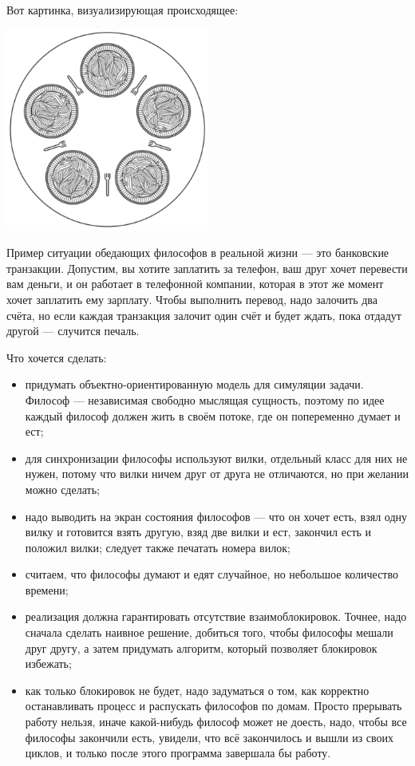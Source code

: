 \documentclass{../../text-style}
\begin{document}
Вот картинка, визуализирующая происходящее:

\begin{center}
    \includegraphics[width=0.5\textwidth]{diningPhilosophers.png}
\end{center}

Пример ситуации обедающих философов в реальной жизни --- это банковские транзакции. Допустим, вы хотите заплатить за телефон, ваш друг хочет перевести вам деньги, и он работает в телефонной компании, которая в этот же момент хочет заплатить ему зарплату. Чтобы выполнить перевод, надо залочить два счёта, но если каждая транзакция залочит один счёт и будет ждать, пока отдадут другой --- случится печаль.

Что хочется сделать:

\begin{itemize}
    \item придумать объектно-ориентированную модель для симуляции задачи. Философ --- независимая свободно мыслящая сущность, поэтому по идее каждый философ должен жить в своём потоке, где он попеременно думает и ест;
    \item для синхронизации философы используют вилки, отдельный класс для них не нужен, потому что вилки ничем друг от друга не отличаются, но при желании можно сделать;
    \item надо выводить на экран состояния философов --- что он хочет есть, взял одну вилку и готовится взять другую, взяд две вилки и ест, закончил есть и положил вилки; следует также печатать номера вилок;
    \item считаем, что философы думают и едят случайное, но небольшое количество времени;
    \item реализация должна гарантировать отсутствие взаимоблокировок. Точнее, надо сначала сделать наивное решение, добиться того, чтобы философы мешали друг другу, а затем придумать алгоритм, который позволяет блокировок избежать;
    \item как только блокировок не будет, надо задуматься о том, как корректно останавливать процесс и распускать философов по домам. Просто прерывать работу нельзя, иначе какой-нибудь философ может не доесть, надо, чтобы все философы закончили есть, увидели, что всё закончилось и вышли из своих циклов, и только после этого программа завершала бы работу.
\end{itemize}
\end{document}
